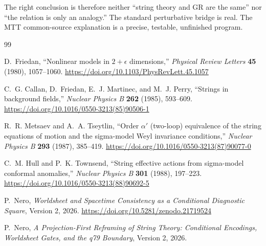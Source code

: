 \documentclass[11pt]{article}
\begin{document}
The right conclusion is therefore neither ``string theory and GR are the same''
nor ``the relation is only an analogy.''  The standard perturbative bridge is
real.  The MTT common-source explanation is a precise, testable, unfinished
program.

\begin{thebibliography}{99}

D.~Friedan,
``Nonlinear models in \(2+\epsilon\) dimensions,''
\emph{Physical Review Letters} \textbf{45} (1980), 1057--1060.
\url{https://doi.org/10.1103/PhysRevLett.45.1057}

C.~G. Callan, D.~Friedan, E.~J. Martinec, and M.~J. Perry,
``Strings in background fields,''
\emph{Nuclear Physics B} \textbf{262} (1985), 593--609.
\url{https://doi.org/10.1016/0550-3213(85)90506-1}

R.~R. Metsaev and A.~A. Tseytlin,
``Order \(\alpha'\) (two-loop) equivalence of the string equations of motion
and the sigma-model Weyl invariance conditions,''
\emph{Nuclear Physics B} \textbf{293} (1987), 385--419.
\url{https://doi.org/10.1016/0550-3213(87)90077-0}

C.~M. Hull and P.~K. Townsend,
``String effective actions from sigma-model conformal anomalies,''
\emph{Nuclear Physics B} \textbf{301} (1988), 197--223.
\url{https://doi.org/10.1016/0550-3213(88)90692-5}

P.~Nero,
\emph{Worldsheet and Spacetime Consistency as a Conditional Diagnostic
Square},
Version 2, 2026.
\url{https://doi.org/10.5281/zenodo.21719524}

P.~Nero,
\emph{A Projection-First Reframing of String Theory: Conditional Encodings,
Worldsheet Gates, and the q79 Boundary},
Version 2, 2026.

\end{thebibliography}
\end{document}
